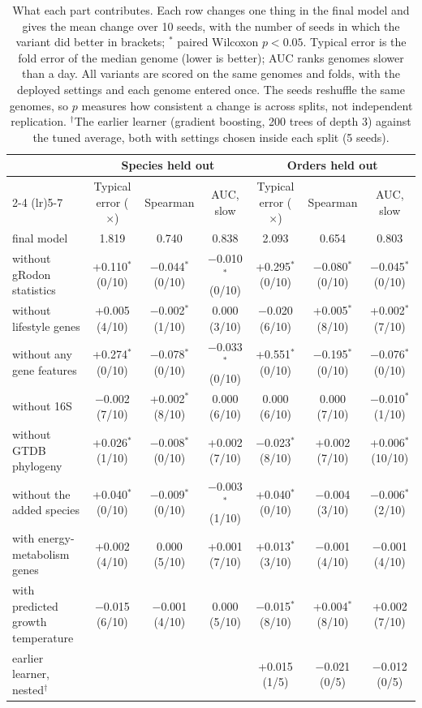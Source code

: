 \begin{table}[t]\centering\footnotesize\setlength{\tabcolsep}{3.5pt}
\caption{What each part contributes. Each row changes one thing in the final model and gives the mean change over 10 seeds, with the number of seeds in which the variant did better in brackets; $^{*}$ paired Wilcoxon $p<0.05$. Typical error is the fold error of the median genome (lower is better); AUC ranks genomes slower than a day. All variants are scored on the same genomes and folds, with the deployed settings and each genome entered once. The seeds reshuffle the same genomes, so $p$ measures how consistent a change is across splits, not independent replication. $^{\dagger}$The earlier learner (gradient boosting, 200 trees of depth 3) against the tuned average, both with settings chosen inside each split (5 seeds).}\label{tab:ablations}
\begin{tabular}{lcccccc}
\toprule
& \multicolumn{3}{c}{Species held out} & \multicolumn{3}{c}{Orders held out} \\
\cmidrule(lr){2-4} \cmidrule(lr){5-7}
& Typical error ($\times$) & Spearman & AUC, slow & Typical error ($\times$) & Spearman & AUC, slow \\
\midrule
final model & 1.819 & 0.740 & 0.838 & 2.093 & 0.654 & 0.803 \\
\midrule
without gRodon statistics & +0.110$^{*}$ (0/10) & $-$0.044$^{*}$ (0/10) & $-$0.010$^{*}$ (0/10) & +0.295$^{*}$ (0/10) & $-$0.080$^{*}$ (0/10) & $-$0.045$^{*}$ (0/10) \\
without lifestyle genes & +0.005 (4/10) & $-$0.002$^{*}$ (1/10) & 0.000 (3/10) & $-$0.020 (6/10) & +0.005$^{*}$ (8/10) & +0.002$^{*}$ (7/10) \\
without any gene features & +0.274$^{*}$ (0/10) & $-$0.078$^{*}$ (0/10) & $-$0.033$^{*}$ (0/10) & +0.551$^{*}$ (0/10) & $-$0.195$^{*}$ (0/10) & $-$0.076$^{*}$ (0/10) \\
without 16S & $-$0.002 (7/10) & +0.002$^{*}$ (8/10) & 0.000 (6/10) & 0.000 (6/10) & 0.000 (7/10) & $-$0.010$^{*}$ (1/10) \\
without GTDB phylogeny & +0.026$^{*}$ (1/10) & $-$0.008$^{*}$ (0/10) & +0.002 (7/10) & $-$0.023$^{*}$ (8/10) & +0.002 (7/10) & +0.006$^{*}$ (10/10) \\
without the added species & +0.040$^{*}$ (0/10) & $-$0.009$^{*}$ (0/10) & $-$0.003$^{*}$ (1/10) & +0.040$^{*}$ (0/10) & $-$0.004 (3/10) & $-$0.006$^{*}$ (2/10) \\
with energy-metabolism genes & +0.002 (4/10) & 0.000 (5/10) & +0.001 (7/10) & +0.013$^{*}$ (3/10) & $-$0.001 (4/10) & $-$0.001 (4/10) \\
with predicted growth temperature & $-$0.015 (6/10) & $-$0.001 (4/10) & 0.000 (5/10) & $-$0.015$^{*}$ (8/10) & +0.004$^{*}$ (8/10) & +0.002 (7/10) \\
earlier learner, nested$^{\dagger}$ & & & & +0.015 (1/5) & $-$0.021 (0/5) & $-$0.012 (0/5) \\
\bottomrule
\end{tabular}
\end{table}
